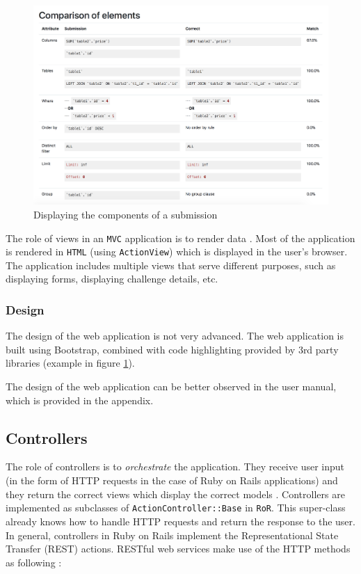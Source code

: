 \begin{figure}[H]
\centering
\includegraphics[width=\textwidth]{Chapters/4-Design/components.png}
\caption{Displaying the components of a submission}
\label{fig:design}
\end{figure}


The role of views in an \texttt{MVC} application is to render data \citep{ruby_on_rails}. Most of the application is rendered in \texttt{HTML} (using \texttt{ActionView}) which is displayed in the user's browser. The application includes multiple views that serve different purposes, such as displaying forms, displaying challenge details, etc.

\subsubsection{Design}

The design of the web application is not very advanced. The web application is built using Bootstrap, combined with code highlighting provided by 3rd party libraries (example in figure \ref{fig:design}).

The design of the web application can be better observed in the user manual, which is provided in the appendix.

\subsection{Controllers} \label{ch:design:web:controller}

The role of controllers is to \textit{orchestrate} the application. They receive user input (in the form of HTTP requests in the case of Ruby on Rails applications) and they return the correct views which display the correct models \citep{ruby_on_rails_book}. Controllers are implemented as subclasses of \texttt{ActionController::Base} in \texttt{RoR}. This super-class already knows how to handle HTTP requests and return the response to the user. In general, controllers in Ruby on Rails implement the Representational State Transfer (REST) actions. RESTful web services make use of the HTTP methods as following \citep{rodriguez2008restful}:

